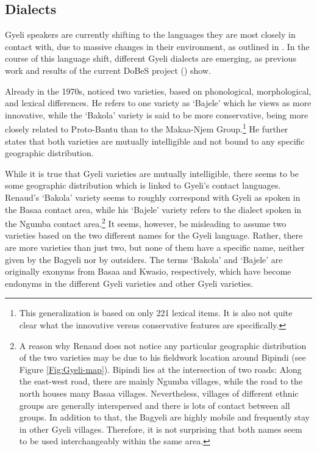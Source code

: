 \subsection{Dialects}
\label{sec:dialects}

Gyeli speakers are currently shifting to the languages they are most closely in contact with, due to massive changes in their environment, as outlined in . In the course of this language shift, different Gyeli dialects are emerging, as previous work and results of the current DoBeS project () show. 

Already in the 1970s, \citet[29]{renaud76} noticed two varieties, based on phonological, morphological, and lexical differences. He refers to one variety as  `Bajele' which he views as more innovative, while the `Bakola' variety is said to be more conservative, being more closely related to Proto-Bantu than to the Makaa-Njem Group.\footnote{This generalization is based on only 221 lexical items. It is also not quite clear what the innovative versus conservative features are specifically.} He further states that both varieties are mutually intelligible and not bound to any specific geographic distribution.

While it is true that Gyeli varieties are mutually intelligible, there seems to be some geographic distribution which is linked to Gyeli's contact languages. Renaud's `Bakola' variety seems to roughly correspond with Gyeli as spoken in the Basaa contact area, while his `Bajele' variety refers to the dialect spoken in the Ngumba contact area.\footnote{A reason why Renaud does not notice any particular geographic distribution of the two varieties may be due to his fieldwork location around Bipindi (see Figure \ref{Fig:Gyeli-map}). Bipindi lies at the intersection of two roads: Along the east-west road, there are mainly Ngumba villages, while the road to the north houses many Basaa villages. Nevertheless, villages of different ethnic groups are generally interspersed and there is lots of contact between all groups. In addition to that, the Bagyeli are highly mobile and frequently stay in other Gyeli villages. Therefore, it is not surprising that both names seem to be used interchangeably within the same area.} 
It seems, however, be misleading to assume two varieties based on the two different names for the Gyeli language.  Rather, there are more varieties than just two, but none of them have a specific name, neither given by the Bagyeli nor by outsiders. The terms `Bakola' and `Bajele' are originally exonyms from Basaa and Kwasio, respectively, which have become endonyms in the different Gyeli varieties and other Gyeli varieties. 


